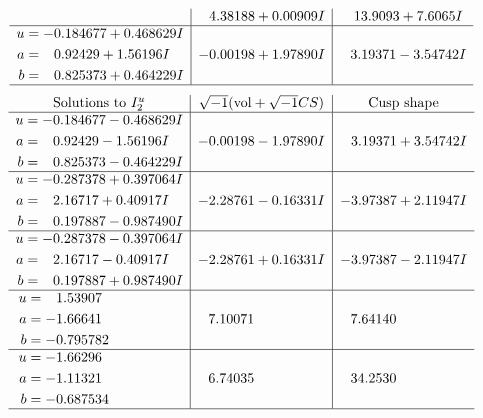 \documentclass[1p]{elsarticle_modified}
\theoremstyle{definition}
\newcommand{\I}{\sqrt{-1}}
\begin{document}
$$\begin{array}{c|c|c}
 & \phantom{-}4.38188 + 0.00909 I & \phantom{-}13.9093 + 7.6065 I \\ \hline\begin{aligned}
u &= -0.184677 + 0.468629 I \\
a &= \phantom{-}0.92429 + 1.56196 I \\
b &= \phantom{-}0.825373 + 0.464229 I\end{aligned}
 & -0.00198 + 1.97890 I & \phantom{-}3.19371 - 3.54742 I\\
 \hline 
 \end{array}$$\newpage$$\begin{array}{c|c|c}  
\text{Solutions to }I^u_{2}& \I (\text{vol} + \sqrt{-1}CS) & \text{Cusp shape}\\
 \hline 
\begin{aligned}
u &= -0.184677 - 0.468629 I \\
a &= \phantom{-}0.92429 - 1.56196 I \\
b &= \phantom{-}0.825373 - 0.464229 I\end{aligned}
 & -0.00198 - 1.97890 I & \phantom{-}3.19371 + 3.54742 I \\ \hline\begin{aligned}
u &= -0.287378 + 0.397064 I \\
a &= \phantom{-}2.16717 + 0.40917 I \\
b &= \phantom{-}0.197887 - 0.987490 I\end{aligned}
 & -2.28761 - 0.16331 I & -3.97387 + 2.11947 I \\ \hline\begin{aligned}
u &= -0.287378 - 0.397064 I \\
a &= \phantom{-}2.16717 - 0.40917 I \\
b &= \phantom{-}0.197887 + 0.987490 I\end{aligned}
 & -2.28761 + 0.16331 I & -3.97387 - 2.11947 I \\ \hline\begin{aligned}
u &= \phantom{-}1.53907\phantom{ +0.000000I} \\
a &= -1.66641\phantom{ +0.000000I} \\
b &= -0.795782\phantom{ +0.000000I}\end{aligned}
 & \phantom{-}7.10071\phantom{ +0.000000I} & \phantom{-}7.64140\phantom{ +0.000000I} \\ \hline\begin{aligned}
u &= -1.66296\phantom{ +0.000000I} \\
a &= -1.11321\phantom{ +0.000000I} \\
b &= -0.687534\phantom{ +0.000000I}\end{aligned}
 & \phantom{-}6.74035\phantom{ +0.000000I} & \phantom{-}34.2530\phantom{ +0.000000I}\\
 \hline 
 \end{array}$$\newpage
\end{document}
